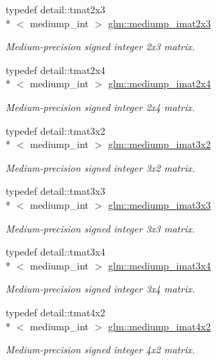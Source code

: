 \begin{DoxyCompactItemize}
typedef detail\-::tmat2x3\\*
$<$ mediump\-\_\-int $>$ \hyperlink{group__gtc__matrix__integer_gaafb4b3293de5875ece1181709eddaa13}{glm\-::mediump\-\_\-imat2x3}
\begin{DoxyCompactList}\small\item\em Medium-\/precision signed integer 2x3 matrix. \end{DoxyCompactList}\item 
typedef detail\-::tmat2x4\\*
$<$ mediump\-\_\-int $>$ \hyperlink{group__gtc__matrix__integer_gaebbf06f493d6299238987c9715dc9064}{glm\-::mediump\-\_\-imat2x4}
\begin{DoxyCompactList}\small\item\em Medium-\/precision signed integer 2x4 matrix. \end{DoxyCompactList}\item 
typedef detail\-::tmat3x2\\*
$<$ mediump\-\_\-int $>$ \hyperlink{group__gtc__matrix__integer_ga91a2f7b0b7ab178581d8e10c56904f5d}{glm\-::mediump\-\_\-imat3x2}
\begin{DoxyCompactList}\small\item\em Medium-\/precision signed integer 3x2 matrix. \end{DoxyCompactList}\item 
typedef detail\-::tmat3x3\\*
$<$ mediump\-\_\-int $>$ \hyperlink{group__gtc__matrix__integer_ga648511f44df045d81db55770887b4354}{glm\-::mediump\-\_\-imat3x3}
\begin{DoxyCompactList}\small\item\em Medium-\/precision signed integer 3x3 matrix. \end{DoxyCompactList}\item 
typedef detail\-::tmat3x4\\*
$<$ mediump\-\_\-int $>$ \hyperlink{group__gtc__matrix__integer_ga2d58e291dd09052a80355106a5a36ea9}{glm\-::mediump\-\_\-imat3x4}
\begin{DoxyCompactList}\small\item\em Medium-\/precision signed integer 3x4 matrix. \end{DoxyCompactList}\item 
typedef detail\-::tmat4x2\\*
$<$ mediump\-\_\-int $>$ \hyperlink{group__gtc__matrix__integer_ga258c149bc7dc443db025b6a7c8a8492b}{glm\-::mediump\-\_\-imat4x2}
\begin{DoxyCompactList}\small\item\em Medium-\/precision signed integer 4x2 matrix. \end{DoxyCompactList}\item 

\end{DoxyCompactItemize}
